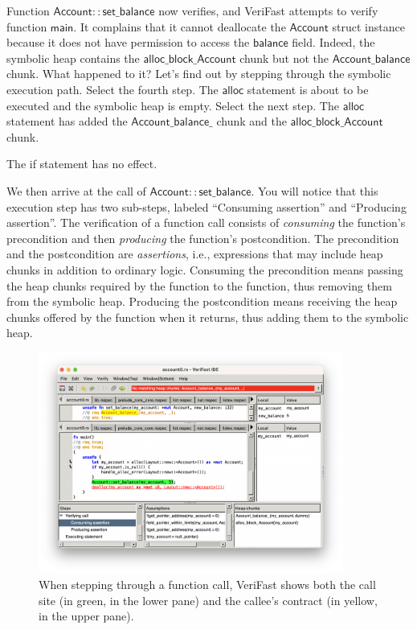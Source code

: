 \documentclass{article}
\begin{document}
Function $\mathsf{Account::set\_balance}$ now verifies, and
VeriFast attempts to verify function $\mathsf{main}$. It
complains that it cannot deallocate the $\mathsf{Account}$ struct
instance because it does not have permission to access the
$\mathsf{balance}$ field. Indeed, the symbolic heap contains
the $\mathsf{alloc\_block\_Account}$ chunk but not the
$\mathsf{Account\_balance}$ chunk. What happened to it? Let's
find out by stepping through the symbolic execution path.
Select the fourth step. The $\mathsf{alloc}$ statement is about
to be executed and the symbolic heap is empty. Select the next
step. The $\mathsf{alloc}$ statement has added the
$\mathsf{Account\_balance\_}$ chunk and the
$\mathsf{alloc\_block\_Account}$ chunk.

The if statement has no effect.

We then arrive at the call of $\mathsf{Account{::}set\_balance}$.
You will notice that this execution step has two sub-steps,
labeled ``Consuming assertion'' and ``Producing assertion''.
The verification of a function call consists of
\emph{consuming} the function's precondition and then
\emph{producing} the function's postcondition. The precondition
and the postcondition are \emph{assertions}, i.e., expressions
that may include heap chunks in addition to ordinary logic.
Consuming the precondition means passing the heap chunks
required by the function to the function, thus removing them
from the symbolic heap. Producing the postcondition means
receiving the heap chunks offered by the function when it
returns, thus adding them to the symbolic heap.

\begin{figure}
\begin{center}
\includegraphics[width=10cm]{illegal_access3.png}
\end{center}
\caption{When stepping through a function call, VeriFast shows both the call site (in green, in the lower pane) and the callee's contract (in yellow, in the upper pane).}\label{figure:call}
\end{figure}
\end{document}

